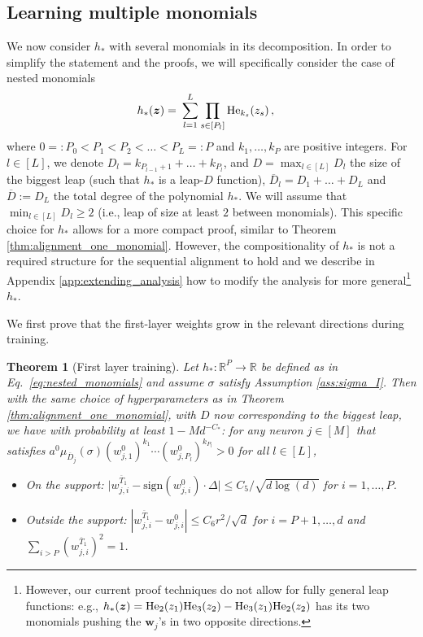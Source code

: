 \documentclass[11pt]{article}
\newcommand{\R}{\mathbb{R}}
\newcommand{\<}{\langle}
\renewcommand{\>}{\rangle}
\newcommand{\sign}{\text{sign}}
\newtheorem{theorem}{Theorem}
\theoremstyle{definition}
\def\bw{{\boldsymbol w}}
\def\bz{{\boldsymbol z}}
\def\bz{{\boldsymbol z}}
\def\He{{\rm He}}
\def\bw{{\boldsymbol w}}
\def\bz{{\boldsymbol z}}
\def\He{{\rm He}}
\def\oT{\overline{T}}
\def\oD{\overline{D}}
\def\oD{\overline{D}}
\begin{document}
\subsection{Learning multiple monomials}\label{sec:multimonomials}

We now consider $h_*$ with several monomials in its decomposition. In order to simplify the statement and the proofs, we will specifically consider the case of nested monomials
\begin{equation}\label{eq:nested_monomials}
\begin{aligned}
h_* (\bz) =&~ \sum_{l = 1}^L \prod_{s \in [P_l]} \He_{k_s} (z_s) \, , 
\end{aligned}
\end{equation}
where $0 =:P_0 < P_1 < P_2 < \ldots <P_L =: P$ and $k_1 , \ldots , k_{P}$ are positive integers.
For $l \in [L]$, we denote $D_l = k_{P_{l-1}+1} + \ldots + k_{P_{l}}$, and $D = \max_{l \in [L]} D_l$ the size of the biggest leap (such that $h_*$ is a leap-$D$ function), $\oD_l = D_1+ \ldots + D_L$ and $\oD := D_L$ the total degree of the polynomial $h_*$. We will assume that $\min_{l \in [L]} D_l \geq 2$ (i.e., leap of size at least $2$ between monomials). This specific choice for $h_*$ allows for a more compact proof, similar to Theorem \ref{thm:alignment_one_monomial}. However, the compositionality of $h_*$ is not a required structure for the sequential alignment to hold and we describe in Appendix \ref{app:extending_analysis} how to modify the analysis for more general\footnote{However, our current proof techniques do not allow for fully general leap functions: e.g., $h_* (\bz) = \He_2(z_1) \He_3(z_2) - \He_3(z_1) \He_2 (z_2)$ has its two monomials pushing the $\bw_j$'s in two opposite directions.} $h_*$.

We first prove that the first-layer weights grow in the relevant directions during training.

\begin{theorem}[First layer training]\label{thm:sequential_alignment} Let $h_* : \R^P \to \R$ be defined as in Eq.~\eqref{eq:nested_monomials} and assume $\sigma$ satisfy Assumption \ref{ass:sigma_I}. Then with the same choice of hyperparameters as in Theorem \ref{thm:alignment_one_monomial}, with $D$ now corresponding to the biggest leap, we have with probability at least $1 - Md^{-C_*}$: for any neuron $j \in [M]$ that satisfies $a^0 \mu_{\oD_j } (\sigma) (w_{j,1}^0)^{k_1} \cdots (w_{j, P_l}^0)^{k_{P_l}} > 0$ for all $l \in [L]$,
\begin{itemize}
    \item[(a)] On the support: $\big\vert  w_{j,i}^{\oT_1}  - \sign (w_{j,i}^0) \cdot \Delta \big\vert \leq C_5 /\sqrt{d \log (d)}$ for $i = 1, \ldots , P$.

    
    \item[(b)] Outside the support: $| w_{j,i}^{\oT_1} - w_{j,i}^0| \leq C_6 r^2 /\sqrt{d}$ for $i = P+1, \ldots , d$ and $\sum_{i >P} (w_{j,i}^{\oT_1} )^2 = 1$.
\end{itemize}
\end{theorem}
\end{document}
